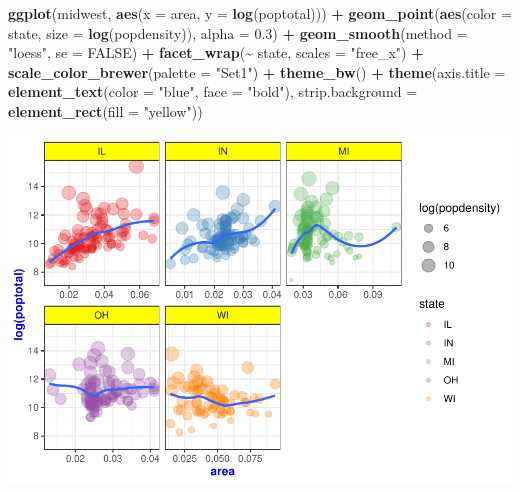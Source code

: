 \documentclass[
]{book}
\newenvironment{Shaded}{\begin{snugshade}}{\end{snugshade}}
\newcommand{\DataTypeTok}[1]{\textcolor[rgb]{0.13,0.29,0.53}{#1}}
\newcommand{\FloatTok}[1]{\textcolor[rgb]{0.00,0.00,0.81}{#1}}
\newcommand{\KeywordTok}[1]{\textcolor[rgb]{0.13,0.29,0.53}{\textbf{#1}}}
\newcommand{\NormalTok}[1]{#1}
\newcommand{\OperatorTok}[1]{\textcolor[rgb]{0.81,0.36,0.00}{\textbf{#1}}}
\newcommand{\OtherTok}[1]{\textcolor[rgb]{0.56,0.35,0.01}{#1}}
\newcommand{\StringTok}[1]{\textcolor[rgb]{0.31,0.60,0.02}{#1}}
\begin{document}
\begin{alert}
\begin{Shaded}
\begin{Highlighting}[]
\KeywordTok{ggplot}\NormalTok{(midwest, }\KeywordTok{aes}\NormalTok{(}\DataTypeTok{x =}\NormalTok{ area, }\DataTypeTok{y =} \KeywordTok{log}\NormalTok{(poptotal))) }\OperatorTok{+}
\StringTok{    }\KeywordTok{geom\_point}\NormalTok{(}\KeywordTok{aes}\NormalTok{(}\DataTypeTok{color =}\NormalTok{ state, }\DataTypeTok{size =} \KeywordTok{log}\NormalTok{(popdensity)), }\DataTypeTok{alpha =} \FloatTok{0.3}\NormalTok{) }\OperatorTok{+}
\StringTok{    }\KeywordTok{geom\_smooth}\NormalTok{(}\DataTypeTok{method =} \StringTok{"loess"}\NormalTok{, }\DataTypeTok{se =} \OtherTok{FALSE}\NormalTok{) }\OperatorTok{+}
\StringTok{    }\KeywordTok{facet\_wrap}\NormalTok{(}\OperatorTok{\textasciitilde{}}\StringTok{ }\NormalTok{state, }\DataTypeTok{scales =} \StringTok{"free\_x"}\NormalTok{) }\OperatorTok{+}
\StringTok{    }\KeywordTok{scale\_color\_brewer}\NormalTok{(}\DataTypeTok{palette =} \StringTok{"Set1"}\NormalTok{) }\OperatorTok{+}
\StringTok{    }\KeywordTok{theme\_bw}\NormalTok{() }\OperatorTok{+}
\StringTok{    }\KeywordTok{theme}\NormalTok{(}\DataTypeTok{axis.title =} \KeywordTok{element\_text}\NormalTok{(}\DataTypeTok{color =} \StringTok{"blue"}\NormalTok{, }\DataTypeTok{face =} \StringTok{"bold"}\NormalTok{),}
          \DataTypeTok{strip.background =} \KeywordTok{element\_rect}\NormalTok{(}\DataTypeTok{fill =} \StringTok{"yellow"}\NormalTok{))       }
\end{Highlighting}
\end{Shaded}

\includegraphics{R/Rgraphics/figures/unnamed-chunk-234-1.pdf}

\end{alert}
\end{document}
